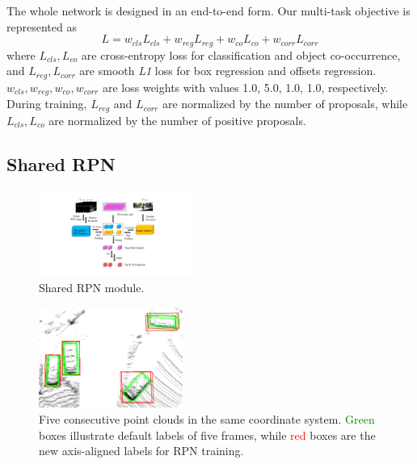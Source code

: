 \documentclass[letterpaper, 10pt, conference]{ieeeconf}  %
\begin{document}
The whole network is designed in an end-to-end form. Our multi-task objective is represented as
\begin{equation}
L = w_{cls}L_{cls} + w_{reg}L_{reg} + w_{co}L_{co} + w_{corr}L_{corr}
\end{equation}
where $L_{cls}, L_{co}$ are cross-entropy loss for classification and object co-occurrence, and $L_{reg}, L_{corr}$ are smooth \textit{L1} loss for box regression and offsets regression. $w_{cls}, w_{reg}, w_{co}, w_{corr}$ are loss weights with values 1.0, 5.0, 1.0, 1.0, respectively. During training, $L_{reg}$ and $L_{corr}$ are normalized by the number of proposals, while $L_{cls}, L_{co}$ are normalized by the number of positive proposals.

\subsection{Shared RPN}

\begin{figure}
	\vspace{-0.8cm}
	\rule{0pt}{1ex}
	\begin{center}
		\includegraphics[trim={7cm, 2.2cm, 8cm, 2cm}, clip,width=0.45\textwidth]{images/rpn.pdf}
	\end{center}
	\caption{Shared RPN module.}
	\label{fig:rpn}
	\vspace{-0.6cm}
\end{figure}

\begin{figure}
	\vspace{-0.8cm}
	\rule{0pt}{1ex}
	\begin{center}
		\includegraphics[width=0.42\textwidth]{images/integrated_boxes.png}
	\end{center}
	\caption{Five consecutive point clouds in the same coordinate system. \textcolor{green}{Green} boxes illustrate default labels of five frames, while \textcolor{red}{red} boxes are the new axis-aligned labels for RPN training.}
	\label{fig:integrated_boxes}
	\setlength{\abovecaptionskip}{-0.3cm}
	\vspace{-0.6cm}
\end{figure}
\end{document}
